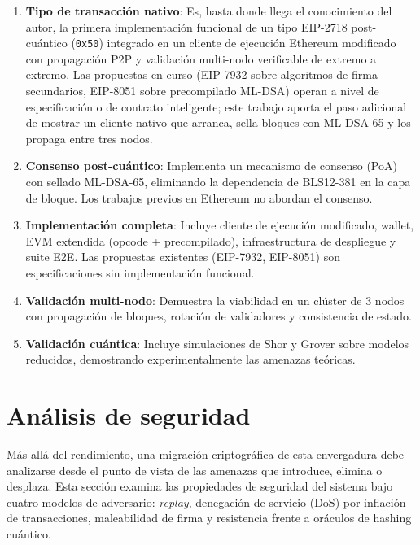 \begin{enumerate}
  \item \textbf{Tipo de transacción nativo}: Es, hasta donde llega el conocimiento del autor, la primera implementación funcional de un tipo EIP-2718 post-cuántico (\texttt{0x50}) integrado en un cliente de ejecución Ethereum modificado con propagación P2P y validación multi-nodo verificable de extremo a extremo. Las propuestas en curso (EIP-7932 sobre algoritmos de firma secundarios, EIP-8051 sobre precompilado ML-DSA) operan a nivel de especificación o de contrato inteligente; este trabajo aporta el paso adicional de mostrar un cliente nativo que arranca, sella bloques con ML-DSA-65 y los propaga entre tres nodos.
  
  \item \textbf{Consenso post-cuántico}: Implementa un mecanismo de consenso (PoA) con sellado ML-DSA-65, eliminando la dependencia de BLS12-381 en la capa de bloque. Los trabajos previos en Ethereum no abordan el consenso.
  
  \item \textbf{Implementación completa}: Incluye cliente de ejecución modificado, wallet, EVM extendida (opcode + precompilado), infraestructura de despliegue y suite E2E. Las propuestas existentes (EIP-7932, EIP-8051) son especificaciones sin implementación funcional.
  
  \item \textbf{Validación multi-nodo}: Demuestra la viabilidad en un clúster de 3 nodos con propagación de bloques, rotación de validadores y consistencia de estado.
  
  \item \textbf{Validación cuántica}: Incluye simulaciones de Shor y Grover sobre modelos reducidos, demostrando experimentalmente las amenazas teóricas.
\end{enumerate}


\section{Análisis de seguridad}
\label{sec:res_security}

Más allá del rendimiento, una migración criptográfica de esta envergadura debe analizarse desde el punto de vista de las amenazas que introduce, elimina o desplaza. Esta sección examina las propiedades de seguridad del sistema bajo cuatro modelos de adversario: \emph{replay}, denegación de servicio (DoS) por inflación de transacciones, maleabilidad de firma y resistencia frente a oráculos de hashing cuántico.

